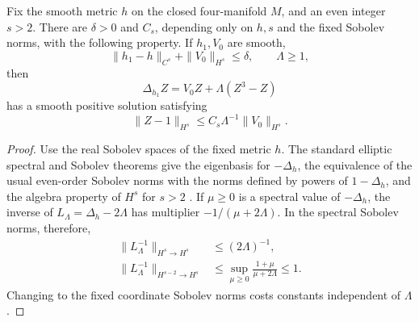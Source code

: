 \begin{lemma}\label{corr:conformal}
Fix the smooth metric \(h\) on the closed four-manifold \(M\), and
an even integer \(s>2\).  There are \(\delta>0\) and \(C_s\),
depending only on \(h,s\) and the fixed Sobolev norms, with the
following property.  If \(h_1,V_0\) are smooth,
\[
 \|h_1-h\|_{C^s}+\|V_0\|_{H^s}\le\delta,
 \qquad \Lambda\ge1,
\]
then
\[
 \Delta_{h_1}Z=V_0Z+\Lambda(Z^3-Z)
\]
has a smooth positive solution satisfying
\begin{equation}\label{corr:Z-smallness}
 \|Z-1\|_{H^s}\le C_s\Lambda^{-1}\|V_0\|_{H^s}.
\end{equation}
\end{lemma}

\begin{proof}
Use the real Sobolev spaces of the fixed metric \(h\).  The standard
elliptic spectral and Sobolev theorems give the eigenbasis for
\(-\Delta_h\), the equivalence of the usual even-order Sobolev norms
with the norms defined by powers of \(1-\Delta_h\), and the algebra
property of \(H^s\) for \(s>2\)
\cite{Taylor2011,TaylorPsido}.  If \(\mu\ge0\) is a spectral value of
\(-\Delta_h\), the inverse of
\(L_\Lambda=\Delta_h-2\Lambda\) has multiplier
\(-1/(\mu+2\Lambda)\).  In the spectral Sobolev norms, therefore,
\begin{align}
 \|L_\Lambda^{-1}\|_{H^s\to H^s}
       &\le (2\Lambda)^{-1},\label{corr:mass-inverse-one}\\
 \|L_\Lambda^{-1}\|_{H^{s-2}\to H^s}
       &\le\sup_{\mu\ge0}\frac{1+\mu}{\mu+2\Lambda}
        \le1.\label{corr:mass-inverse-two}
\end{align}
Changing to the fixed coordinate Sobolev norms costs constants
independent of \(\Lambda\).


\end{proof}
